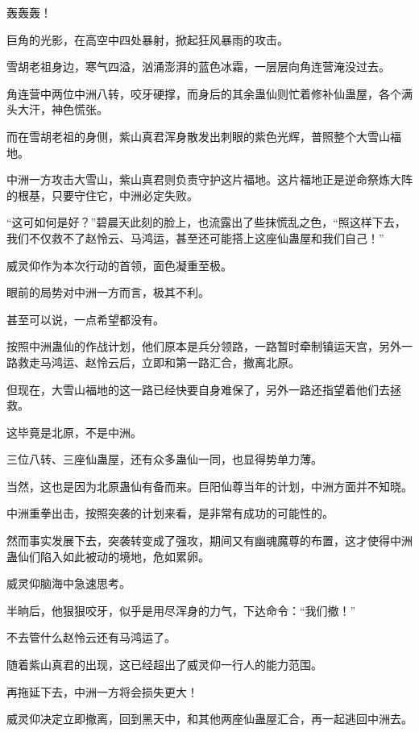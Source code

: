 
\begin{this_body}

轰轰轰！

巨角的光影，在高空中四处暴射，掀起狂风暴雨的攻击。

雪胡老祖身边，寒气四溢，汹涌澎湃的蓝色冰霜，一层层向角连营淹没过去。

角连营中两位中洲八转，咬牙硬撑，而身后的其余蛊仙则忙着修补仙蛊屋，各个满头大汗，神色慌张。

而在雪胡老祖的身侧，紫山真君浑身散发出刺眼的紫色光辉，普照整个大雪山福地。

中洲一方攻击大雪山，紫山真君则负责守护这片福地。这片福地正是逆命祭炼大阵的根基，只要守住它，中洲必定失败。

“这可如何是好？”碧晨天此刻的脸上，也流露出了些抹慌乱之色，“照这样下去，我们不仅救不了赵怜云、马鸿运，甚至还可能搭上这座仙蛊屋和我们自己！”

威灵仰作为本次行动的首领，面色凝重至极。

眼前的局势对中洲一方而言，极其不利。

甚至可以说，一点希望都没有。

按照中洲蛊仙的作战计划，他们原本是兵分领路，一路暂时牵制镇运天宫，另外一路救走马鸿运、赵怜云后，立即和第一路汇合，撤离北原。

但现在，大雪山福地的这一路已经快要自身难保了，另外一路还指望着他们去拯救。

这毕竟是北原，不是中洲。

三位八转、三座仙蛊屋，还有众多蛊仙一同，也显得势单力薄。

当然，这也是因为北原蛊仙有备而来。巨阳仙尊当年的计划，中洲方面并不知晓。

中洲重拳出击，按照突袭的计划来看，是非常有成功的可能性的。

然而事实发展下去，突袭转变成了强攻，期间又有幽魂魔尊的布置，这才使得中洲蛊仙们陷入如此被动的境地，危如累卵。

威灵仰脑海中急速思考。

半晌后，他狠狠咬牙，似乎是用尽浑身的力气，下达命令：“我们撤！”

不去管什么赵怜云还有马鸿运了。

随着紫山真君的出现，这已经超出了威灵仰一行人的能力范围。

再拖延下去，中洲一方将会损失更大！

威灵仰决定立即撤离，回到黑天中，和其他两座仙蛊屋汇合，再一起逃回中洲去。


\end{this_body}
